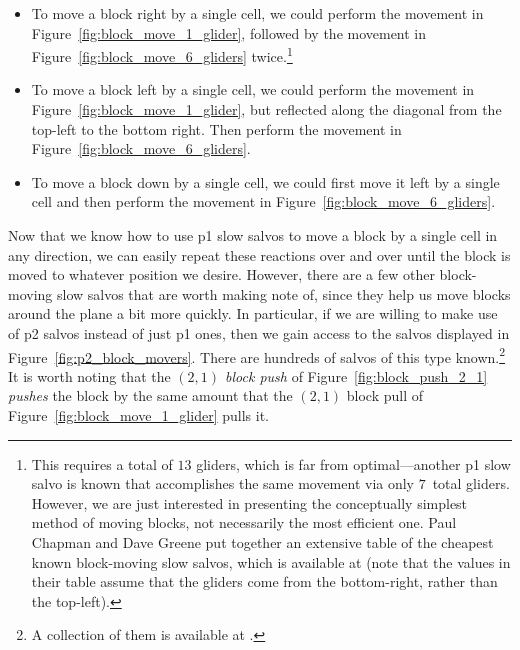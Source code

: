 \begin{itemize}
	\item To move a block right by a single cell, we could perform the movement in Figure~\ref{fig:block_move_1_glider}, followed by the movement in Figure~\ref{fig:block_move_6_gliders} twice.\footnote{This requires a total of $13$ gliders, which is far from optimal---another p1 slow salvo is known that accomplishes the same movement via only $7$~total gliders. However, we are just interested in presenting the conceptually simplest method of moving blocks, not necessarily the most efficient one. Paul Chapman and Dave Greene put together an extensive table of the cheapest known block-moving slow salvos, which is available at  (note that the values in their table assume that the gliders come from the bottom-right, rather than the top-left).}\smallskip
	
	\item To move a block left by a single cell, we could perform the movement in Figure~\ref{fig:block_move_1_glider}, but reflected along the diagonal from the top-left to the bottom right. Then perform the movement in Figure~\ref{fig:block_move_6_gliders}.\smallskip
	
	\item To move a block down by a single cell, we could first move it left by a single cell and then perform the movement in Figure~\ref{fig:block_move_6_gliders}.\smallskip
\end{itemize}

Now that we know how to use p1 slow salvos to move a block by a single cell in any direction, we can easily repeat these reactions over and over until the block is moved to whatever position we desire. However, there are a few other block-moving slow salvos that are worth making note of, since they help us move blocks around the plane a bit more quickly. In particular, if we are willing to make use of p2 salvos instead of just p1 ones, then we gain access to the salvos displayed in Figure~\ref{fig:p2_block_movers}. There are hundreds of salvos of this type known.\footnote{A collection of them is available at .} It is worth noting that the \emph{$(2,1)$ block push} of Figure~\ref{fig:block_push_2_1} \emph{pushes} the block by the same amount that the $(2,1)$ block pull of Figure~\ref{fig:block_move_1_glider} pulls it.


